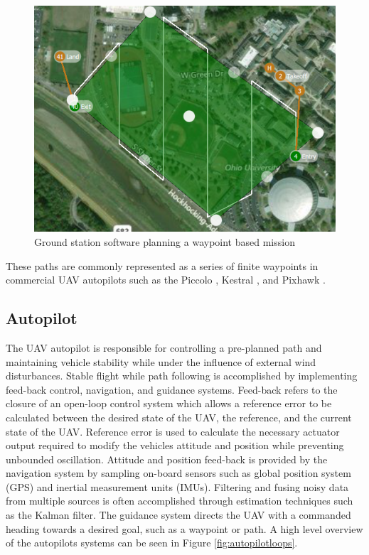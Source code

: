 \documentclass[numbered,pdftex]{ohio-etd}
\begin{document}
\begin{figure}[H]
	\centering
	\includegraphics[width=12cm]{PaperFigures/Literature/groundStationPlanning}
	\caption{Ground station software planning a waypoint based mission}
	\label{fig:groundstationplanning}
\end{figure}

These paths are commonly represented as a series of finite waypoints in commercial UAV autopilots such as  the Piccolo \cite{piccolo}, Kestral \cite{kestrel}, and Pixhawk \cite{pix}.


\subsection{Autopilot}
The UAV autopilot is responsible for controlling a pre-planned path and maintaining vehicle stability while under the influence of external wind disturbances. Stable flight while path following is accomplished by implementing feed-back control, navigation, and guidance systems. Feed-back refers to the closure of an open-loop control system which allows a reference error to be calculated between the desired state of the UAV, the reference, and the current state of the UAV. Reference error is used to calculate the necessary actuator output required to modify the vehicles attitude and position while preventing unbounded oscillation. Attitude and position feed-back is provided by the navigation system by sampling on-board sensors such as global position system (GPS) and inertial measurement units (IMUs). Filtering and fusing noisy data from multiple sources is often accomplished through estimation techniques such as the Kalman filter. The guidance system directs the UAV with a commanded heading towards a desired goal, such as a waypoint or path. A high level overview of the autopilots systems can be seen in Figure \ref{fig:autopilotloops}.\\
\end{document}
